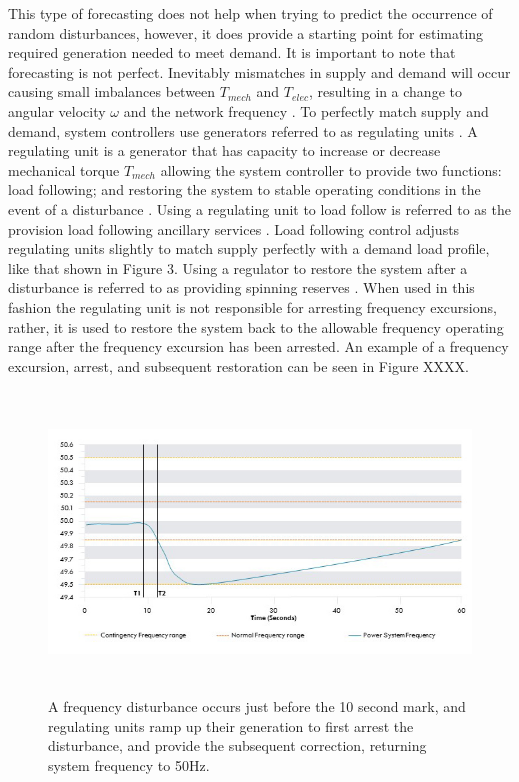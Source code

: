 \documentclass[12pt, a4paper]{article}
\begin{document}
This type of forecasting does not help when trying to predict the occurrence of random disturbances, however, it does provide a starting point for estimating required generation needed to meet demand. It is important to note that forecasting is not perfect. Inevitably mismatches in supply and demand will occur causing small imbalances between $T_{mech}$ and $T_{elec}$, resulting in a change to angular velocity $\omega$ and the network frequency \cite{Glover2012}. To perfectly match supply and demand, system controllers use generators referred to as regulating units \cite{Kothari2011}. A regulating unit is a generator that has capacity to increase or decrease mechanical torque $T_{mech}$ allowing the system controller to provide two functions: load following; and restoring the system to stable operating conditions in the event of a disturbance \cite{Grainger1994}. Using a regulating unit to load follow is referred to as the provision load following ancillary services \cite{AEMO202002}. Load following control adjusts regulating units slightly to match supply perfectly with a demand load profile, like that shown in Figure 3. Using a regulator to restore the system after a disturbance is referred to as providing spinning reserves \cite{AEMO202002}. When used in this fashion the regulating unit is not responsible for arresting frequency excursions, rather, it is used to restore the system back to the allowable frequency operating range after the frequency excursion has been arrested. An example of a frequency excursion, arrest, and subsequent restoration can be seen in Figure XXXX.

\begin{figure}[h]
\centering
\includegraphics[height=8cm]{frequency_arrest}
\caption{A frequency disturbance occurs just before the 10 second mark, and regulating units ramp up their generation to first arrest the disturbance, and provide the subsequent correction, returning system frequency to 50$\si{\hertz}$.}
\end{figure}
\end{document}
